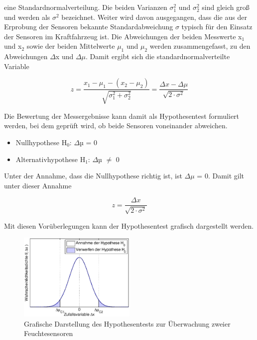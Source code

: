 \noindent eine Standardnormalverteilung. Die beiden Varianzen $\sigma_{1}^{2}$ und $\sigma_{2}^{2}$ sind gleich gro{\ss} und werden als $\sigma^{2}$ bezeichnet. Weiter wird davon ausgegangen, dass die aus der Erprobung der Sensoren bekannte Standardabweichung $\sigma$ typisch f\"{u}r den Einsatz der Sensoren im Kraftfahrzeug ist. Die Abweichungen der beiden Messwerte x$_{1}$ und x$_{2}$ sowie der beiden Mittelwerte $\mu_{1}$ und $\mu_{2}$ werden zusammengefasst, zu den Abweichungen $\Delta$x und $\Delta\mu$. Damit ergibt sich die standardnormalverteilte Variable

\begin{equation}\label{eq:sixonehundredsixtyone}
z=\dfrac{x_{1} -\mu _{1} -(x_{2} -\mu _{2})}{\sqrt{\sigma _{1}^{2} +\sigma _{2}^{2}}} =\dfrac{\Delta x-\Delta \mu }{\sqrt{2\cdot \sigma ^{2}}}
\end{equation}

\noindent Die Bewertung der Messergebnisse kann damit als Hypothesentest formuliert werden, bei dem gepr\"{u}ft wird, ob beide Sensoren voneinander abweichen.

\begin{itemize}
    \item Nullhypothese H$_{0}$: $\Delta$µ = 0
    \item Alternativhypothese H$_{1}$: $\Delta$µ $\neq$ 0
\end{itemize}

\noindent Unter der Annahme, dass die Nullhypothese richtig ist, ist $\Delta\mu$ = 0. Damit gilt unter dieser Annahme

\begin{equation}\label{eq:sixonehundredsixtytwo}
z=\dfrac{\Delta x}{\sqrt{2\cdot \sigma ^{2}}}
\end{equation}

\noindent Mit diesen Vor\"{u}berlegungen kann der Hypothesentest grafisch dargestellt werden.

\noindent 
\begin{figure}[H]
  \centerline{\includegraphics[width=0.5\textwidth]{Kapitel6/Bilder/image15}}
  \caption{Grafische Darstellung des Hypothesentests zur \"{U}berwachung zweier Feuchtesensoren}
  \label{fig:DiagnoseFeuchtesensor2}
\end{figure}

